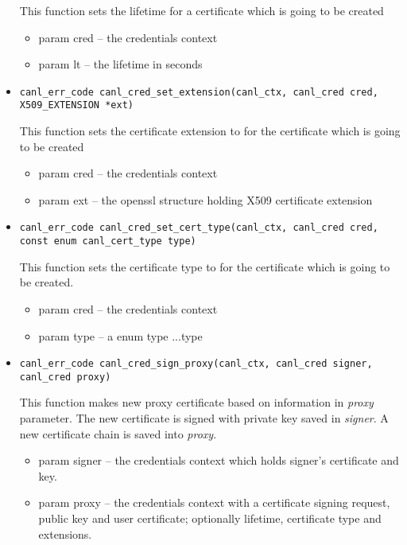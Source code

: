 \begin{itemize}
  This function sets the lifetime for a certificate which is going to 
  be created
  \begin{itemize}
    \item param cred -- the credentials context
    \item param lt -- the lifetime in seconds
  \end{itemize}
  \item \begin{verbatim}
canl_err_code canl_cred_set_extension(canl_ctx, canl_cred cred,
X509_EXTENSION *ext)\end{verbatim}
  This function sets the certificate extension to for the certificate 
  which is going to be created
  \begin{itemize}
    \item param cred -- the credentials context 
    \item param ext -- the openssl structure holding X509 certificate extension
  \end{itemize}
\item \begin{verbatim}
canl_err_code canl_cred_set_cert_type(canl_ctx, canl_cred cred,
const enum canl_cert_type type)\end{verbatim}
  This function sets the certificate type to for the certificate
  which is going to be created.
  \begin{itemize}
    \item param cred -- the credentials context
    \item param type -- a \CANL enum type ...\TODO type
  \end{itemize}
  \item \begin{verbatim}
canl_err_code canl_cred_sign_proxy(canl_ctx, canl_cred signer,
canl_cred proxy)\end{verbatim}
  This function makes new proxy certificate based on information in 
  \textit{proxy} parameter. The new certificate is signed with private key 
  saved in \textit{signer}. A new certificate chain is saved 
  into \textit{proxy}.
  \begin{itemize}
    \item param signer -- the credentials context which holds signer's certificate
    and key.
    \item param proxy -- the credentials context with a certificate 
    signing request, public key and user certificate; optionally lifetime,
    certificate type and extensions.
  \end{itemize}

\end{itemize}
